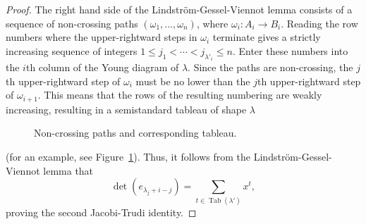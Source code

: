 \documentclass[11pt]{amsproc}
\theoremstyle{definition}
\theoremstyle{example}
\DeclareMathOperator{\tab}{Tab}
\begin{document}
\begin{proof}
  The right hand side of the Lindstr\"om-Gessel-Viennot lemma consists of a sequence of non-crossing paths $(\omega_1,\dotsc,\omega_n)$, where $\omega_i:A_i\to B_i$.
  Reading the row numbers where the upper-rightward steps in $\omega_i$ terminate gives a strictly increasing sequence of integers $1\leq j_1 < \dotsb < j_{\lambda'_i}\leq n$.
  Enter these numbers into the $i$th column of the Young diagram of $\lambda$.
  Since the paths are non-crossing, the $j$th upper-rightward step of $\omega_i$ must be no lower than the $j$th upper-rightward step of $\omega_{i+1}$.
  This means that the rows of the resulting numbering are weakly increasing, resulting in a semistandard tableau of shape $\lambda$
  \begin{figure}
    \centering
    \hspace{1cm}
    \caption{Non-crossing paths and corresponding tableau.}
    \label{fig:jte}
  \end{figure}
  (for an example, see Figure~\ref{fig:jte}).
  Thus, it follows from the Lindstr\"om-Gessel-Viennot lemma that
  \begin{displaymath}
    \det(e_{\lambda_j+i-j}) = \sum_{t\in \tab(\lambda')} x^t,
  \end{displaymath}
  proving the second Jacobi-Trudi identity.
\end{proof}
\end{document}
